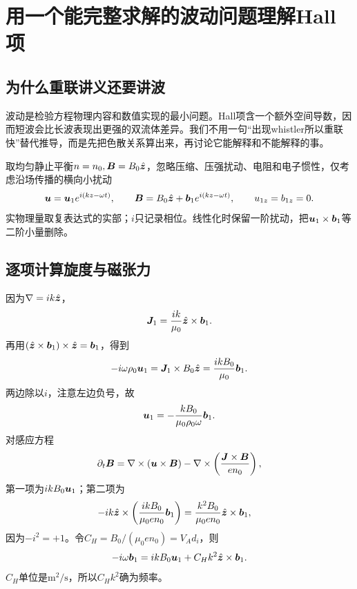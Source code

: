 \chapter{用一个能完整求解的波动问题理解Hall项}
\label{hall:waves}
\section{为什么重联讲义还要讲波}
波动是检验方程物理内容和数值实现的最小问题。Hall项含一个额外空间导数，因而短波会比长波表现出更强的双流体差异。我们不用一句“出现whistler所以重联快”替代推导，而是先把色散关系算出来，再讨论它能解释和不能解释的事。

取均匀静止平衡$n=n_0,\bm{B}=B_0\hat{\bm{z}}$，忽略压缩、压强扰动、电阻和电子惯性，仅考虑沿场传播的横向小扰动
\begin{equation}
\bm{u}=\bm{u}_1e^{i(kz-\omega t)},\qquad
\bm{B}=B_0\hat{\bm{z}}+\bm{b}_1e^{i(kz-\omega t)},\qquad
u_{1z}=b_{1z}=0.
\end{equation}
实物理量取复表达式的实部；$i$只记录相位。线性化时保留一阶扰动，把$\bm{u}_1\times\bm{b}_1$等二阶小量删除。

\section{逐项计算旋度与磁张力}
因为$\nabla=ik\hat{\bm{z}}$，
\begin{equation}
\bm{J}_1=\frac{ik}{\mu_0}\hat{\bm{z}}\times\bm{b}_1.
\end{equation}
再用$(\hat{\bm{z}}\times\bm{b}_1)\times\hat{\bm{z}}=\bm{b}_1$，得到
\begin{equation}
-i\omega\rho_0\bm{u}_1=\bm{J}_1\times B_0\hat{\bm{z}}
=\frac{ikB_0}{\mu_0}\bm{b}_1.
\end{equation}
两边除以$i$，注意左边负号，故
\begin{equation}\bm{u}_1=-\frac{kB_0}{\mu_0\rho_0\omega}\bm{b}_1.\label{hall:waveu}\end{equation}
对感应方程
\begin{equation}
\partial_t\bm{B}=\nabla\times(\bm{u}\times\bm{B})
-\nabla\times\left(\frac{\bm{J}\times\bm{B}}{en_0}\right),
\end{equation}
第一项为$ikB_0\bm{u}_1$；第二项为
\begin{align}
-ik\hat{\bm{z}}\times\left(\frac{ikB_0}{\mu_0en_0}\bm{b}_1\right)
&=\frac{k^2B_0}{\mu_0en_0}\hat{\bm{z}}\times\bm{b}_1,
\end{align}
因为$-i^2=+1$。令$C_H=B_0/(\mu_0en_0)=V_Ad_i$，则
\begin{equation}
-i\omega\bm{b}_1=ikB_0\bm{u}_1+C_Hk^2\hat{\bm{z}}\times\bm{b}_1.\label{hall:waveb}
\end{equation}
$C_H$单位是$\mathrm{m^2/s}$，所以$C_Hk^2$确为频率。

